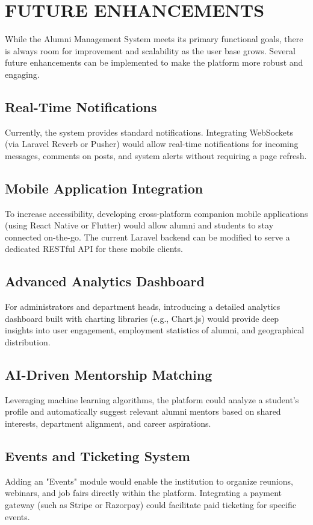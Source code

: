 \chapter{FUTURE ENHANCEMENTS}

While the Alumni Management System meets its primary functional goals, there is always room for improvement and scalability as the user base grows. Several future enhancements can be implemented to make the platform more robust and engaging.

\section{Real-Time Notifications}
Currently, the system provides standard notifications. Integrating WebSockets (via Laravel Reverb or Pusher) would allow real-time notifications for incoming messages, comments on posts, and system alerts without requiring a page refresh.

\section{Mobile Application Integration}
To increase accessibility, developing cross-platform companion mobile applications (using React Native or Flutter) would allow alumni and students to stay connected on-the-go. The current Laravel backend can be modified to serve a dedicated RESTful API for these mobile clients.

\section{Advanced Analytics Dashboard}
For administrators and department heads, introducing a detailed analytics dashboard built with charting libraries (e.g., Chart.js) would provide deep insights into user engagement, employment statistics of alumni, and geographical distribution.

\section{AI-Driven Mentorship Matching}
Leveraging machine learning algorithms, the platform could analyze a student's profile and automatically suggest relevant alumni mentors based on shared interests, department alignment, and career aspirations.

\section{Events and Ticketing System}
Adding an "Events" module would enable the institution to organize reunions, webinars, and job fairs directly within the platform. Integrating a payment gateway (such as Stripe or Razorpay) could facilitate paid ticketing for specific events.
